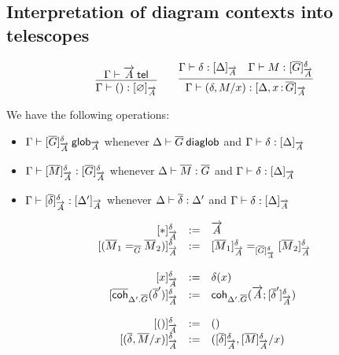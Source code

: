 \subsection{Interpretation of diagram contexts into telescopes}

\begin{small}
\[\infer
    {\ofinterp{\Gamma}{()}{\emptyctx}{\tel A}}
    {\wftel{\Gamma}{\tel A}}
  \qquad
  \infer
    {\ofinterp{\Gamma}{(\delta,M/x)}{\Delta,\tptm{x}{\diag G}}{\tel A}}
    {\ofinterp{\Gamma}{\delta}{\Delta}{\tel A}
    &\ofglob{\Gamma}{M}{\interpglob{\diag G}{\tel A}{\delta}}}
\]
\end{small}

We have the following operations:
\begin{itemize}
\item ${\Gamma} \vdash {[{\ensuremath{\overline{G}}}]_{\ensuremath{\overrightarrow{A}}}^{\delta}} \: \mathsf{glob}_{\overrightarrow{A}}$ whenever
  ${\Delta} \vdash {\ensuremath{\overline{G}}} \: \mathsf{diaglob}$ and ${\Gamma} \vdash {\delta} : {[ \Delta ]_{\overrightarrow{A}}}$
\item ${\Gamma} \vdash {[{\ensuremath{\overline{M}}}]_{\ensuremath{\overrightarrow{A}}}^{\delta}} : {} {[{\overline{G}}]_{\overrightarrow{A}}^{\delta}}$ whenever ${\Delta} \vdash {\ensuremath{\overline{M}}} : {\overline{G}}$ and
  ${\Gamma} \vdash {\delta} : {[ \Delta ]_{\overrightarrow{A}}}$
\item ${\Gamma} \vdash {[{\ensuremath{\overline{\delta}}}]_{\ensuremath{\overrightarrow{A}}}^{\delta}} : {[ \Delta' ]_{\overrightarrow{A}}}$
  whenever ${\Delta} \vdash {\ensuremath{\overline{\delta}}} : {\Delta'}$ and
  ${\Gamma} \vdash {\delta} : {[ \Delta ]_{\overrightarrow{A}}}$
\end{itemize}

\begin{small}
  \[
  \begin{array}{rcl}
    \interpglob{\diagbase}{\tel A}{\delta} & := & \tel A \\
    \interpglob{(\homj{\diag G}{\diag M_1}{\diag M_2})}{\tel A}{\delta} & := &
    \homj{\interpglob{\diag G}{\tel A}{\delta}}
         {\interpglob{\diag M_1}{\tel A}{\delta}}
    {\interpglob{\diag M_2}{\tel A}{\delta}}\\\\

    \interpglob{x}{\tel A}{\delta} & := & \delta(x) \\
    \interpglob{\diagcoh{\Delta'.\diag{G}}{\diag \delta'}}{\tel A}{\delta} & := &
    \coh{\Delta'.\diag G}{\tel A}{\interpglob{\diag\delta'}{\tel A}{\delta}}\\\\

    \interpglob{()}{\tel A}{\delta} & := & () \\
    \interpglob{(\diag \delta,\diag M/x)}{\tel A}{\delta} & := &
    (\interpglob{\diag\delta}{\tel A}{\delta},\interpglob{\diag
    M}{\tel A}{\delta}/x)
  \end{array}
  \]
\end{small}

